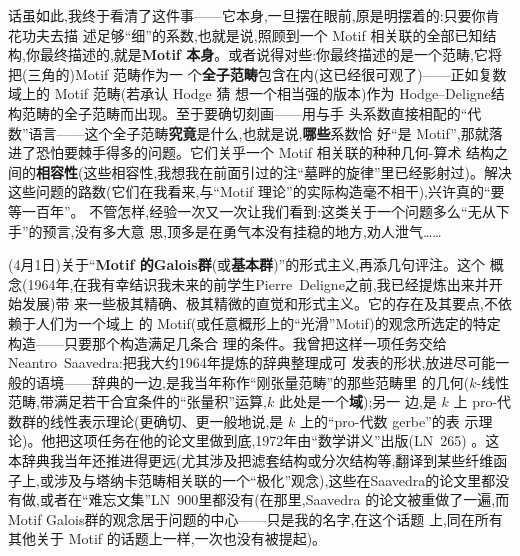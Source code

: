 \pmark{}话虽如此,我终于看清了这件事——它本身,一旦摆在眼前,原是明摆着的:只要你肯花功夫去描
述足够“细”的系数,也就是说,照顾到一个 Motif 相关联的全部已知结构,你最终描述的,就是\textbf{Motif
本身}。或者说得对些:你最终描述的是一个范畴,它将把(三角的)Motif 范畴作为一
个\textbf{全子范畴}包含在内(这已经很可观了)——正如复数域上的 Motif 范畴(若承认 Hodge 猜
想一个相当强的版本)作为 Hodge--Deligne结构范畴的全子范畴而出现。至于要确切刻画——用与手
头系数直接相配的“代数”语言——这个全子范畴\textbf{究竟}是什么,也就是说,\textbf{哪些}系数恰
好“是 Motif”,那就落进了恐怕要棘手得多的问题。它们关乎一个 Motif 相关联的种种几何-算术
结构之间的\textbf{相容性}(这些相容性,我想我在前面引过的注“墓畔的旋律”里已经影射过)。解决
这些问题的路数(它们在我看来,与“Motif 理论”的实际构造毫不相干),兴许真的“要等一百年”。
不管怎样,经验一次又一次让我们看到:这类关于一个问题多么“无从下手”的预言,没有多大意
思,顶多是在勇气本没有挂稳的地方,劝人泄气……

(4月1日)关于“\textbf{Motif 的Galois群}(或\textbf{基本群})”的形式主义,再添几句评注。这个
概念(1964年,在我有幸结识我未来的前学生Pierre~Deligne之前,我已经提炼出来并开始发展)带
来一些极其精确、极其精微的直觉和形式主义。它的存在及其要点,不依赖于人们为一个域上
的 Motif(或任意概形上的“光滑”Motif)的观念所选定的特定构造——只要那个构造满足几条合
理的条件。我曾把这样一项任务交给Neantro~Saavedra:把我大约1964年提炼的辞典整理成可
发表的形状,放进尽可能一般的语境——辞典的一边,是我当年称作“刚张量范畴”的那些范畴里
的几何($k$-线性范畴,带满足若干合宜条件的“张量积”运算,$k$ 此处是一个\textbf{域});另一
边,是 $k$ 上 pro-代数群的线性表示理论(更确切、\dmark{}更一般地说,是 $k$ 上的“pro-代数 gerbe”的表
示理论)。他把这项任务在他的论文里做到底,1972年由“数学讲义”出版(LN~265)
。这本辞典我当年还推进得更远(尤其涉及把滤套结构或分次结构等,翻译到某些纤维函子上,或涉及与塔纳卡范畴相关联的一个“极化”观念),这些在Saavedra的论文里都没有做,或者在“难忘文集”LN~900里都没有(在那里,Saavedra
的论文被重做了一遍,而 Motif Galois群的观念居于问题的中心——只是我的名字,在这个话题
上,同在所有其他关于 Motif 的话题上一样,一次也没有被提起)。

